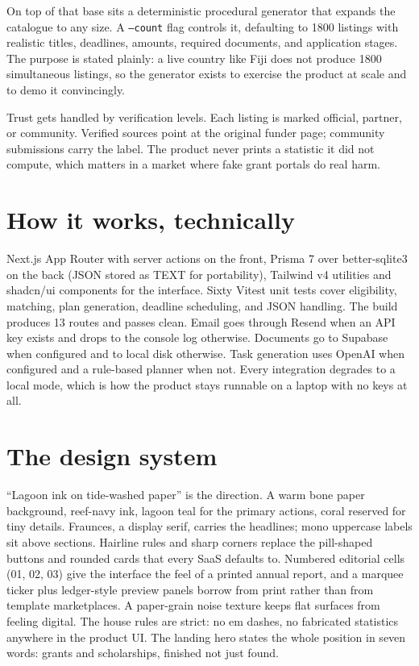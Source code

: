 \documentclass[11pt]{article}
\begin{document}
On top of that base sits a deterministic procedural generator that expands the catalogue to any size. A \texttt{--count} flag controls it, defaulting to 1800 listings with realistic titles, deadlines, amounts, required documents, and application stages. The purpose is stated plainly: a live country like Fiji does not produce 1800 simultaneous listings, so the generator exists to exercise the product at scale and to demo it convincingly.

Trust gets handled by verification levels. Each listing is marked official, partner, or community. Verified sources point at the original funder page; community submissions carry the label. The product never prints a statistic it did not compute, which matters in a market where fake grant portals do real harm.

\section{How it works, technically}

Next.js App Router with server actions on the front, Prisma 7 over better-sqlite3 on the back (JSON stored as TEXT for portability), Tailwind v4 utilities and shadcn/ui components for the interface. Sixty Vitest unit tests cover eligibility, matching, plan generation, deadline scheduling, and JSON handling. The build produces 13 routes and passes clean. Email goes through Resend when an API key exists and drops to the console log otherwise. Documents go to Supabase when configured and to local disk otherwise. Task generation uses OpenAI when configured and a rule-based planner when not. Every integration degrades to a local mode, which is how the product stays runnable on a laptop with no keys at all.

\section{The design system}

``Lagoon ink on tide-washed paper'' is the direction. A warm bone paper background, reef-navy ink, lagoon teal for the primary actions, coral reserved for tiny details. Fraunces, a display serif, carries the headlines; mono uppercase labels sit above sections. Hairline rules and sharp corners replace the pill-shaped buttons and rounded cards that every SaaS defaults to. Numbered editorial cells (01, 02, 03) give the interface the feel of a printed annual report, and a marquee ticker plus ledger-style preview panels borrow from print rather than from template marketplaces. A paper-grain noise texture keeps flat surfaces from feeling digital. The house rules are strict: no em dashes, no fabricated statistics anywhere in the product UI. The landing hero states the whole position in seven words: grants and scholarships, finished not just found.
\end{document}
